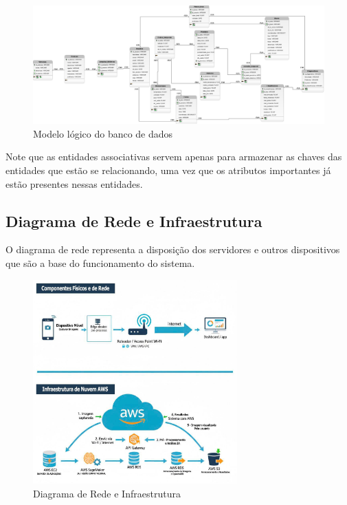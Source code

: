 \documentclass[
  a4paper,%
  12pt,%
  english,%
  brazilian,%
]{article}
\begin{document}
            \begin{figure}[h]
\centering
\caption{Modelo lógico do banco de dados}%
\label{fig:diagrama-objetos}
 \includegraphics[width=1.0\textwidth]{Logos/logico.png}
\end{figure}

    Note que as entidades associativas servem apenas para armazenar as chaves das entidades que estão se relacionando, uma vez que os atributos importantes já estão presentes nessas entidades.

\subsection*{Diagrama de Rede e Infraestrutura}

    O diagrama de rede representa a disposição dos servidores e outros dispositivos que são a base do funcionamento do sistema.

            \begin{figure}[h]
\centering
\caption{Diagrama de Rede e Infraestrutura}%
\label{fig:diagrama-objetos}
 \includegraphics[width=0.7\textwidth]{Logos/infra.jpg}
\end{figure}
\end{document}
